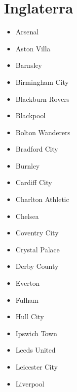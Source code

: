 \section{Inglaterra}\label{sec:equipos-eng}
\begin{multicols}{2}
	\begin{itemize}
	    \setlength{\itemsep}{1pt}
	    \setlength{\parskip}{0pt}
	    \setlength{\parsep}{0pt}

	\item Arsenal

		\item Aston Villa

		\item Barnsley

		\item Birmingham City

		\item Blackburn Rovers

		\item Blackpool

		\item Bolton Wanderers

		\item Bradford City

		\item Burnley

		\item Cardiff City

		\item Charlton Athletic

		\item Chelsea

		\item Coventry City

		\item Crystal Palace

		\item Derby County

		\item Everton

		\item Fulham

		\item Hull City

		\item Ipswich Town

		\item Leeds United

		\item Leicester City

		\item Liverpool


\end{itemize}
\end{multicols}
